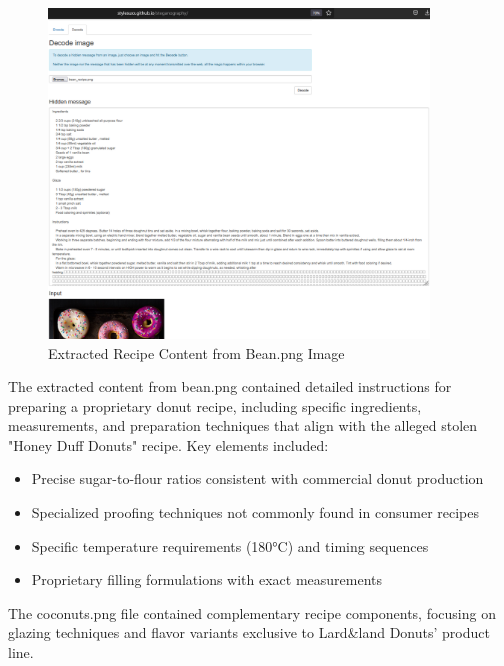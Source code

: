 \begin{figure}[htbp]
    \centering
    \includegraphics[width=0.9\textwidth]{images/Artifact and Evidence Recovery/bean_extract.png}
    \caption{Extracted Recipe Content from Bean.png Image}
    \label{fig:extracted_recipe}
\end{figure}

The extracted content from bean.png contained detailed instructions for preparing a proprietary donut recipe, including specific ingredients, measurements, and preparation techniques that align with the alleged stolen "Honey Duff Donuts" recipe. Key elements included:

\begin{itemize}
    \item Precise sugar-to-flour ratios consistent with commercial donut production
    \item Specialized proofing techniques not commonly found in consumer recipes
    \item Specific temperature requirements (180°C) and timing sequences
    \item Proprietary filling formulations with exact measurements
\end{itemize}

The coconuts.png file contained complementary recipe components, focusing on glazing techniques and flavor variants exclusive to Lard\&land Donuts' product line.

